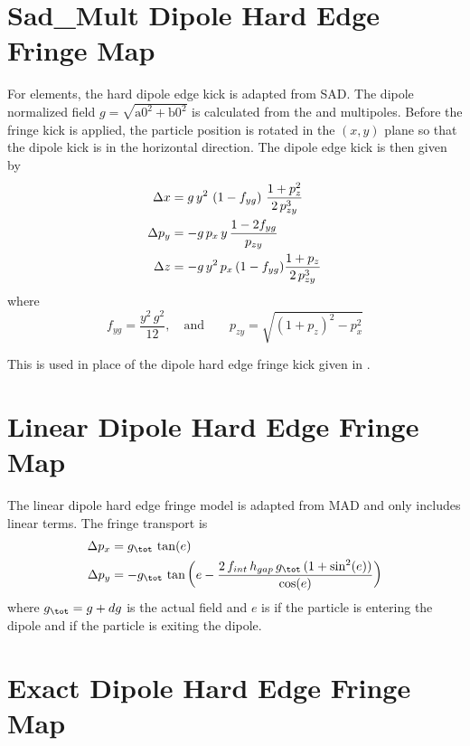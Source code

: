 \section{Sad\_Mult Dipole Hard Edge Fringe Map} 
\label{s:sad.mult.bend.fringe}

For  elements, the hard dipole edge kick is adapted from SAD. The dipole normalized
field $g = \sqrt{\text{a0}^2 + \text{b0}^2}$ is calculated from the  and 
multipoles. Before the fringe kick is applied, the particle position is rotated in the $(x,y)$ plane
so that the dipole kick is in the horizontal direction. The dipole edge kick is then given by
\begin{align}
  \Delta x &= g \, y^2 \, \left( 1 - f_{yg} \right) \, \frac{1 + p_z^2}{2 \, p_{zy}^3} \nonumber \\
  \Delta p_y &= -g \, p_x \, y \, \frac{1 - 2f_{yg}}{p_{zy}} \\
  \Delta z &= -g \, y^2 \, p_x \, (1 - f_{yg}) \frac{1 + p_z}{2 \, p_{zy}^3} \nonumber
\end{align}
where
\begin{equation}
  f_{yg} = \frac{y^2 \, g^2}{12}, \quad \text{and} \qquad
  p_{zy} = \sqrt{(1+p_z)^2 - p_x^2}
\end{equation}

This is used in place of the dipole hard edge fringe kick given in .

\section{Linear Dipole Hard Edge Fringe Map}
\label{s:lin.dip.fringe}

The linear dipole hard edge fringe model is adapted from MAD\cite{b:maduser} and only includes linear
terms. The fringe transport is
\begin{align}
  \Delta p_x &= g_\tot \, \tan(e) \CRNO
  \Delta p_y &= -g_\tot \, \tan \left( e - 
    \frac{2 \, f_{int} \, h_{gap} \, g_\tot \, (1 + \sin^2(e))}{\cos(e)} \right)
\end{align}
where $g_\tot = g + dg$ is the actual field and $e$ is  if the particle is entering the
dipole and  if the particle is exiting the dipole.

\section{Exact Dipole Hard Edge Fringe Map}
\label{s:exact.dip.fringe}

